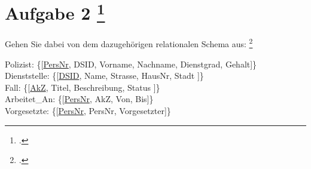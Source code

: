\documentclass{lehramt-informatik-aufgabe}
\begin{document}

\section{Aufgabe 2
\footcite[Thema 1 Teilaufgabe 1 Aufgabe 2]{examen:66116:2016:03}}

\noindent
Gehen Sie dabei von dem dazugehörigen relationalen Schema aus:
\footcite{db:pu:3}

\bigskip

{
\noindent
\ttfamily
\footnotesize
Polizist: \{[\underline{PersNr}, DSID, Vorname, Nachname, Dienstgrad, Gehalt]\}\\
Dienststelle: \{[\underline{DSID}, Name, Strasse, HausNr, Stadt ]\}\\
Fall: \{[\underline{AkZ}, Titel, Beschreibung, Status ]\}\\
Arbeitet\_An: \{[\underline{PersNr}, AkZ, Von, Bis]\}\\
Vorgesetzte: \{[\underline{PersNr}, PersNr, Vorgesetzter]\}
}

\bigskip
\end{document}
